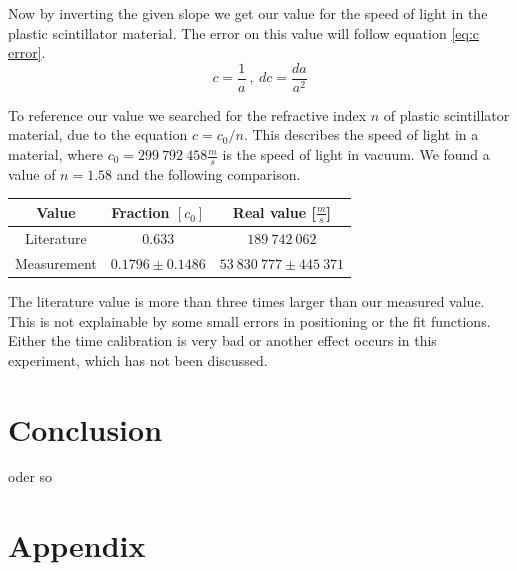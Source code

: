 \documentclass[]{article}
\begin{document}
Now by inverting the given slope we get our value for the speed of light in the plastic scintillator material. The error on this value will follow equation \ref{eq:c error}.
\begin{equation} \label{eq:c error}
c=\frac{1}{a}\:,\: dc=\frac{da}{a^2}
\end{equation}

To reference our value we searched for the refractive index $n$ of plastic scintillator material, due to the equation $ c= c_0 / n$. This describes the speed of light in a material, where $c_0 = 299\ 792\ 458 \frac{m}{s}$ is the speed of light in vacuum. We found a value of $n=1.58$ \cite{refractive index} and the following comparison.

\begin{table}[H]
\centering
\begin{tabular}{c|c|c}
Value & Fraction $[c_0]$ & Real value [$\frac{m}{s}$] \\ \hline \hline
Literature & $0.633$ & $189\ 742\ 062$  \\ \hline
Measurement & $0.1796 \pm 0.1486$ & $ 53\ 830\ 777 \pm 445\ 371$ \\ \hline
\end{tabular}
\end{table}

The literature value is more than three times larger than our measured value. This is not explainable by some small errors in positioning or the fit functions. Either the time calibration is very bad or another effect occurs in this experiment, which has not been discussed.




\section{Conclusion}
 oder so


\section{Appendix}\label{appendix}
\end{document}
